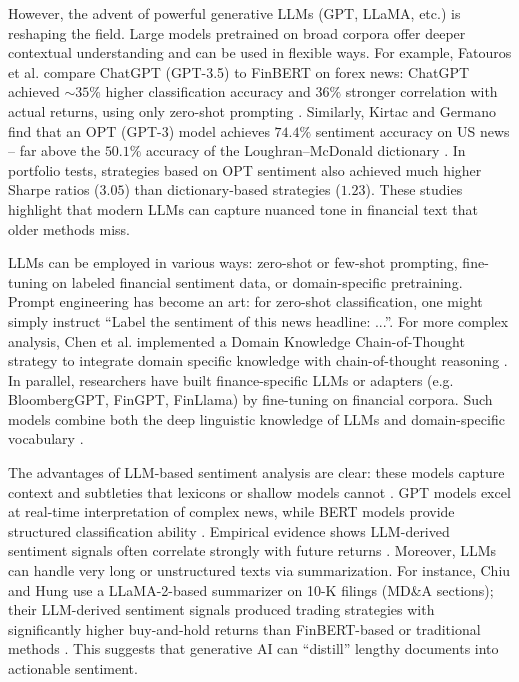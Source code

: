 However, the advent of powerful generative \gls{LLM}s (GPT, LLaMA, etc.) is reshaping the field. Large models pretrained on broad corpora offer deeper contextual understanding and can be used in flexible ways. For example, Fatouros et al. compare ChatGPT (GPT-3.5) to FinBERT on forex news: ChatGPT achieved \(\sim 35\%\) higher classification accuracy and \(36\%\) stronger correlation with actual returns, using only zero-shot prompting \cite{Fatouros2023}. Similarly, Kirtac and Germano find that an OPT (GPT-3) model achieves \(74.4\%\) sentiment accuracy on US news – far above the \(50.1\%\) accuracy of the Loughran–McDonald dictionary \cite{Kirtac2024}. In portfolio tests, strategies based on OPT sentiment also achieved much higher Sharpe ratios (\(3.05\)) than dictionary-based strategies (\(1.23\)). These studies highlight that modern LLMs can capture nuanced tone in financial text that older methods miss.

\gls{LLM}s can be employed in various ways: zero-shot or few-shot prompting, fine-tuning on labeled financial sentiment data, or domain-specific pretraining. Prompt engineering has become an art: for zero-shot classification, one might simply instruct “Label the sentiment of this news headline: ...”. For more complex analysis, Chen et al. implemented a Domain Knowledge Chain-of-Thought strategy to integrate domain specific knowledge with chain-of-thought reasoning \cite{Chen2025}. In parallel, researchers have built finance-specific \gls{LLM}s or adapters (e.g. BloombergGPT, FinGPT, FinLlama) by fine-tuning on financial corpora. Such models combine both the deep linguistic knowledge of \gls{LLM}s and domain-specific vocabulary \cite{Nie2024}.

The advantages of \gls{LLM}-based sentiment analysis are clear: these models capture context and subtleties that lexicons or shallow models cannot \cite{LiuArulappan2024, Kirtac2024}. GPT models excel at real-time interpretation of complex news, while \gls{BERT} models provide structured classification ability \cite{LiuArulappan2024}. Empirical evidence shows \gls{LLM}-derived sentiment signals often correlate strongly with future returns \cite{Fatouros2023, Kirtac2024}. Moreover, \gls{LLM}s can handle very long or unstructured texts via summarization. For instance, Chiu and Hung use a LLaMA-2-based summarizer on 10-K filings (MD\&A sections); their \gls{LLM}-derived sentiment signals produced trading strategies with significantly higher buy-and-hold returns than FinBERT-based or traditional methods \cite{Chiu2024}. This suggests that generative AI can “distill” lengthy documents into actionable sentiment.

